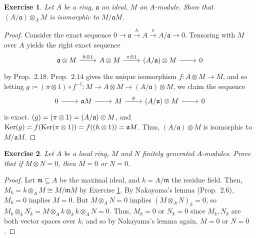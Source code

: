 \documentclass[12pt,letterpaper]{article}
\newtheorem{problem}{Exercise}[section]
\theoremstyle{definition}
\theoremstyle{remark}
\numberwithin{figure}{problem}
\numberwithin{equation}{section}
\let\Im\relax
\DeclareMathOperator{\Im}{Im}
\DeclareMathOperator{\Ker}{Ker}
\begin{document}
\begin{problem}\label{exc:2.2}
  Let
  $A$ be a ring,
  $\mathfrak{a}$ an ideal,
  $M$ an
  $A$-module.
  Show that
  $(A/\mathfrak{a}) \otimes_A
  M$ is isomorphic to
  $M/\mathfrak{a}M$.
\end{problem}
\begin{proof}
  Consider the exact sequence
  $0 \to \mathfrak{a} \xrightarrow{h} A \xrightarrow{\pi} A/\mathfrak{a} \to
  0$.
  Tensoring with
  $M$ over
  $A$ yields the right exact sequence
  \begin{equation*}
    \begin{tikzcd}
      \mathfrak{a} \otimes M \rar{h \otimes 1} &
      A \otimes M \rar{\pi \otimes 1} &
      (A/\mathfrak{a}) \otimes M \rar &
      0
    \end{tikzcd}
  \end{equation*}
  by
  Prop.~$2.18$.
  Prop.~$2.14$ gives the unique isomorphism
  $f\colon A \otimes M \to
  M$, and so letting
  $g\coloneqq (\pi \otimes 1) \circ f^{-1} \colon M \to A \otimes M \to (A/\mathfrak{a}) \otimes
  M$, we claim the sequence
  \begin{equation*}
    \begin{tikzcd}
      0 \rar & \mathfrak{a}M \rar &
      M \rar{g} &
      (A/\mathfrak{a}) \otimes M \rar &
      0
    \end{tikzcd}
  \end{equation*}
  is exact.
  $\Im(g) = \Im(\pi \otimes 1) = (A/\mathfrak{a}) \otimes
  M$, and
  $\Ker(g) = f(\Ker(\pi \otimes 1)) = f(\Im(h \otimes 1)) =
  \mathfrak{a}M$.
  Thus,
  $(A/\mathfrak{a}) \otimes
  M$ is isomorphic to
  $M/\mathfrak{a}M$.
\end{proof}

\begin{problem}
  Let
  $A$ be a local ring,
  $M$ and
  $N$ finitely generated
  $A$-modules.
  Prove that if
  $M \otimes N =
  0$, then
  $M =
  0$ or
  $N =
  0$.
\end{problem}
\begin{proof}
  Let
  $\mathfrak{m} \subseteq
  A$ be the maximal ideal, and
  $k =
  A/\mathfrak{m}$ the residue field.
  Then,
  $M_k = k \otimes_A M \cong
  M/\mathfrak{m}M$ by Exercise \ref{exc:2.2}.
  By Nakayama's lemma (Prop.~2.6),
  $M_k =
  0$ implies
  $M =
  0$.
  But
  $M \otimes_A N =
  0$ implies
  $(M \otimes_A N)_k =
  0$, so
  $M_k \otimes_k N_k = M \otimes_A k \otimes_k k \otimes_A N =
  0$.
  Thus,
  $M_k =
  0$ or
  $N_k =
  0$ since
  $M_k,N_k$ are both vector spaces over
  $k$, and so by Nakayama's lemma again,
  $M =
  0$ or
  $N =
  0$.
\end{proof}
\end{document}
